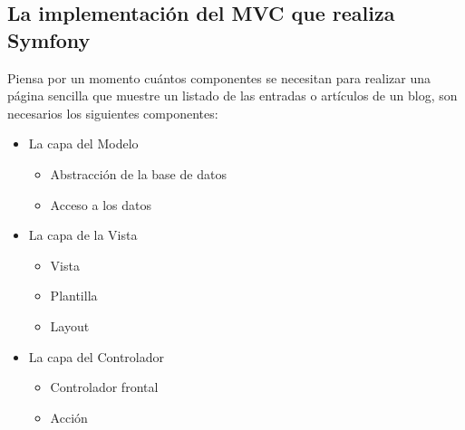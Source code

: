 \subsection{La implementación del MVC que realiza Symfony}
Piensa por un momento cuántos componentes se necesitan para realizar una página sencilla que muestre un listado de las entradas o artículos de un blog, son necesarios los siguientes componentes:
\begin{itemize}
    \item La capa del Modelo
          \begin{itemize}
              \item Abstracción de la base de datos
              \item Acceso a los datos
          \end{itemize}
    \item La capa de la Vista
          \begin{itemize}
              \item Vista
              \item Plantilla
              \item Layout
          \end{itemize}
    \item La capa del Controlador
          \begin{itemize}
              \item Controlador frontal
              \item Acción
          \end{itemize}
\end{itemize}

